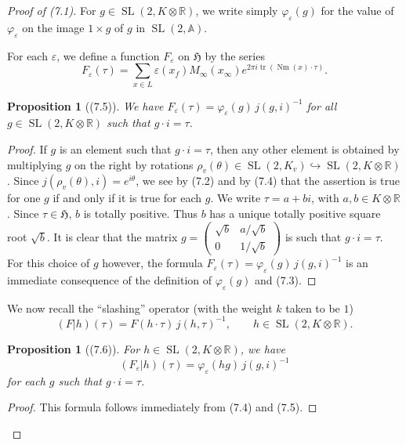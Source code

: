 \documentclass[12pt,a4paper]{article}
\theoremstyle{plain}
\newtheorem{proposition}[theorem]{Proposition}
\theoremstyle{definition}
\theoremstyle{remark}
\DeclareMathOperator{\SL}{SL}
\DeclareMathOperator{\tr}{tr}
\DeclareMathOperator{\Nm}{Nm}
\begin{document}
\begin{proof}[Proof of (7.1)]
For $g \in \SL(2, K \otimes \mathbb{R})$, we write simply $\varphi_\varepsilon(g)$ for the value of $\varphi_\varepsilon$ on the image $1 \times g$ of $g$ in $\SL(2, \mathbb{A})$.

For each $\varepsilon$, we define a function $F_\varepsilon$ on $\mathfrak{H}$ by the series
\[
F_\varepsilon(\tau) = \sum_{x \in L} \varepsilon(x_f) M_\infty(x_\infty) e^{2\pi i \tr(\Nm(x) \cdot \tau)}.
\]

\begin{proposition}[(7.5)]\label{prop:7.5}
We have $F_\varepsilon(\tau) = \varphi_\varepsilon(g) \, j(g, i)^{-1}$ for all $g \in \SL(2, K \otimes \mathbb{R})$ such that $g \cdot i = \tau$.
\end{proposition}

\begin{proof}
If $g$ is an element such that $g \cdot i = \tau$, then any other element is obtained by multiplying $g$ on the right by rotations $\rho_v(\theta) \in \SL(2, K_v) \hookrightarrow \SL(2, K \otimes \mathbb{R})$. Since $j(\rho_v(\theta), i) = e^{i\theta}$, we see by (7.2) and by (7.4) that the assertion is true for one $g$ if and only if it is true for each $g$. We write $\tau = a + bi$, with $a, b \in K \otimes \mathbb{R}$. Since $\tau \in \mathfrak{H}$, $b$ is totally positive. Thus $b$ has a unique totally positive square root $\sqrt{b}$. It is clear that the matrix $g = \begin{pmatrix} \sqrt{b} & a/\sqrt{b} \\ 0 & 1/\sqrt{b} \end{pmatrix}$ is such that $g \cdot i = \tau$. For this choice of $g$ however, the formula $F_\varepsilon(\tau) = \varphi_\varepsilon(g) \, j(g, i)^{-1}$ is an immediate consequence of the definition of $\varphi_\varepsilon(g)$ and (7.3).
\end{proof}

We now recall the ``slashing'' operator (with the weight $k$ taken to be $1$)
\[
(F|h)(\tau) = F(h \cdot \tau) \, j(h, \tau)^{-1}, \qquad h \in \SL(2, K \otimes \mathbb{R}).
\]

\begin{proposition}[(7.6)]\label{prop:7.6}
For $h \in \SL(2, K \otimes \mathbb{R})$, we have
\[
(F_\varepsilon|h)(\tau) = \varphi_\varepsilon(hg) \, j(g, i)^{-1}
\]
for each $g$ such that $g \cdot i = \tau$.
\end{proposition}

\begin{proof}
This formula follows immediately from (7.4) and (7.5).
\end{proof}


\end{proof}
\end{document}
